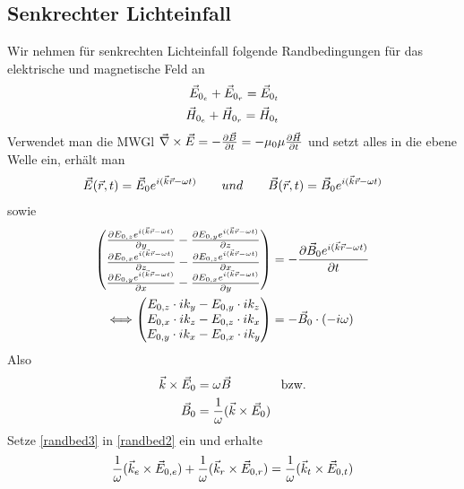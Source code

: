 
\subsection{Senkrechter Lichteinfall}
Wir nehmen für senkrechten Lichteinfall folgende Randbedingungen für
das elektrische und magnetische Feld an
\begin{align}
  \vecE_{0_e} + \vecE_{0_r} = \vecE_{0_t} \label{randbed1}\\
  \vecH_{0_e} + \vecH_{0_r} = \vecH_{0_t} \label{randbed2}
\end{align}
Verwendet man die MWGl
$\vecna\times\vecE = -\dif[\vecB]{t} = -\muo\mu\dif[\vecH]{t}$
und setzt alles in die ebene Welle ein, erhält man
\begin{gather*}
  \vecE(\vecr,t) = \vecE_0 e^{i(\veck\vecr-\omega t)} 
  \qquad{und}\qquad
  \vecB(\vecr,t) = \vecB_0 e^{i(\veck\vecr-\omega t)} 
\end{gather*}
sowie
\begin{align*}
  \begin{pmatrix}
    \dif[E_{0,z}e^{i(\veck\vecr-\omega t)}]{y}
    - \dif[E_{0,y}e^{i(\veck\vecr-\omega t)}]{z}\\
    \dif[E_{0,x}e^{i(\veck\vecr-\omega t)}]{z}
    - \dif[E_{0,z}e^{i(\veck\vecr-\omega t)}]{x}\\
    \dif[E_{0,y}e^{i(\veck\vecr-\omega t)}]{x}
    - \dif[E_{0,x}e^{i(\veck\vecr-\omega t)}]{y}\\
  \end{pmatrix}
  &= - \dif[\vecB_0e^{i(\veck\vecr-\omega t)}]{t}\\
  \Longleftrightarrow
  \begin{pmatrix}
    E_{0,z}\cdot ik_y - E_{0,y} \cdot ik_z\\
    E_{0,x}\cdot ik_z - E_{0,z} \cdot ik_x\\
    E_{0,y}\cdot ik_x - E_{0,x} \cdot ik_y
  \end{pmatrix}
  & = -\vecB_0\cdot (-i\omega)
\end{align*}
Also
\begin{align}\nonumber
  \veck\times\vecE_0 &= \omega\vecB \qquad\qquad\text{bzw.}\\
  \vecB_0 &= \frac{1}{\omega}(\veck\times\vecE_0) \label{randbed3}
\end{align}
Setze \eqref{randbed3} in \eqref{randbed2} ein und erhalte
\begin{gather*}
  \frac{1}{\omega}(\veck_e\times\vecE_{0,e}) 
  +   \frac{1}{\omega}(\veck_r\times\vecE_{0,r})
  = \frac{1}{\omega}(\veck_t\times\vecE_{0,t}) 
\end{gather*}
